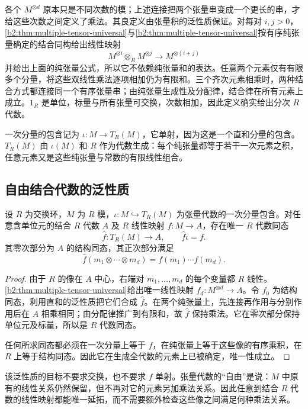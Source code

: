 各个 \(M^{\otimes d}\) 原本只是不同次数的模；上述连接把两个张量串变成一个更长的串，才给这些次数之间定义了乘法。其良定义由张量积的泛性质保证。对每对 \(i,j>0\)，\cref{b2:thm:multiple-tensor-universal}与\cref{b2:thm:multiple-tensor-universal}按有序纯张量确定的结合同构给出线性映射
\[
	M^{\otimes i}\otimes_RM^{\otimes j}\longrightarrow M^{\otimes(i+j)}
\]
并给出上面的纯张量公式，所以它不依赖纯张量和的表达。任意两个元素仅有有限多个分量，将这些双线性乘法逐项相加仍为有限和。三个齐次元素相乘时，两种结合方式都连接同一个有序张量串；由纯张量生成性及分配律，结合律在所有元素上成立。\(1_R\) 是单位，标量与所有张量可交换，次数相加，因此定义确实给出分次 \(R\) 代数。

\ProseParagraphBreak
一次分量的包含记为 \(\iota:M\rightarrow T_R(M)\)，它单射，因为这是一个直和分量的包含。\(T_R(M)\) 由 \(\iota(M)\) 和 \(R\) 作为代数生成：每个纯张量都等于若干一次元素之积，任意元素又是这些纯张量与常数的有限线性组合。

\subsection{自由结合代数的泛性质}
\label{b2:subsec:0802:02}

\begin{theorem}[张量代数的泛性质]\label{b2:thm:tensor-algebra-universal}
	设 \(R\) 为交换环，\(M\) 为 \(R\) 模，\(\iota:M\hookrightarrow T_R(M)\) 为张量代数的一次分量包含。对任意含单位元的结合 \(R\) 代数 \(A\) 及 \(R\) 线性映射 \(f:M\rightarrow A\)，存在唯一 \(R\) 代数同态
	\[
		\widehat f:T_R(M)\longrightarrow A,\qquad \widehat f\iota=f.
	\]
	其零次部分为 \(A\) 的结构同态，其正次部分满足
	\[
		\widehat f(m_1\otimes\cdots\otimes m_d)=f(m_1)\cdots f(m_d).
	\]
\end{theorem}
\begin{proof}
	由于 \(R\) 的像在 \(A\) 中心，右端对 \(m_1,\ldots,m_d\) 的每个变量都 \(R\) 线性。\cref{b2:thm:multiple-tensor-universal}给出唯一线性映射 \(f_d:M^{\otimes d}\rightarrow A\)。令 \(f_0\) 为结构同态，利用直和的泛性质把它们合成 \(\widehat f\)。在两个纯张量上，先连接再作用与分别作用后在 \(A\) 相乘相同；由分配律推广到有限和，故 \(\widehat f\) 保持乘法。它在零次部分保持单位元及标量，所以是 \(R\) 代数同态。

	任何所求同态都必须在一次分量上等于 \(f\)，在纯张量上等于这些像的有序乘积，在 \(R\) 上等于结构同态。因此它在生成全代数的元素上已被确定，唯一性成立。
\end{proof}

该泛性质的目标不要求交换，也不要求 \(f\) 单射。张量代数的“自由”是说：\(M\) 中原有的线性关系仍然保留，但不再对它的元素另加乘法关系。因此任意到结合 \(R\) 代数的线性映射都能唯一延拓，而不需要额外检查这些像之间满足何种乘法关系。

